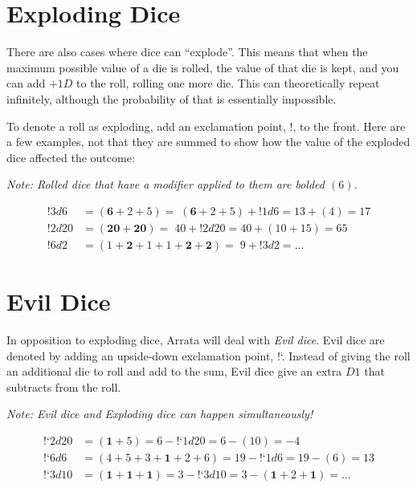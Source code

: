 \documentclass[../main.tex]{subfiles}
\begin{document}
    \section{Exploding Dice}

    There are also cases where dice can ``explode''. This means that when the maximum possible value of a die is rolled, the value of that die is kept, and you can add $+1D$ to the roll, rolling one more die. This can theoretically repeat infinitely, although the probability of that is essentially impossible.

    To denote a roll as exploding, add an exclamation point, $!$, to the front. Here are a few examples, not that they are summed to show how the value of the exploded dice affected the outcome:
    
    \emph{Note: Rolled dice that have a modifier applied to them are bolded $(\textbf{$6$})$.}
    \vspace*{-0.325cm}
    \begin{mdframed}[style=Arrata]
        \begin{align*}
            !3d6    & = (\textbf{6} + 2 + 5) =\; (\textbf{6} + 2 + 5) + !1d6 = 13 + (4) = 17  \\
            !2d20   & = (\textbf{20} + \textbf{20}) =\; 40 + !2d20 = 40 + (10 + 15) = 65      \\
            !6d2    & = (1 + \textbf{2} + 1 + 1 + \textbf{2} + \textbf{2}) =\; 9 + !3d2  = \dots    
        \end{align*}
    \end{mdframed}

    \section{Evil Dice}

    In opposition to exploding dice, Arrata will deal with {\em Evil dice}. Evil dice are denoted by adding an upside-down exclamation point, !`. Instead of giving the roll an additional die to roll and add to the sum, Evil dice give an extra $D1$ that subtracts from the roll.

    \emph{Note: Evil dice and Exploding dice can happen simultaneously!}
    \begin{mdframed}[style=Arrata]
        \begin{align*}
            \text{!`}2d20  & = (\textbf{1} + 5) = 6 - \text{!`}1d20 = 6 - (10) = -4                  \\
            \text{!`}6d6   & = (4 + 5 + 3 + \textbf{1} + 2 + 6) = 19 -  \text{!`}1d6 = 19 - (6) = 13 \\
            \text{!`}3d10  & = (\textbf{1} + \textbf{1} + \textbf{1}) = 3 - \text{!`}3d10 = 3 - (\textbf{1} + 2 + \textbf{1}) = \ldots
        \end{align*}
    \end{mdframed}
\end{document}
